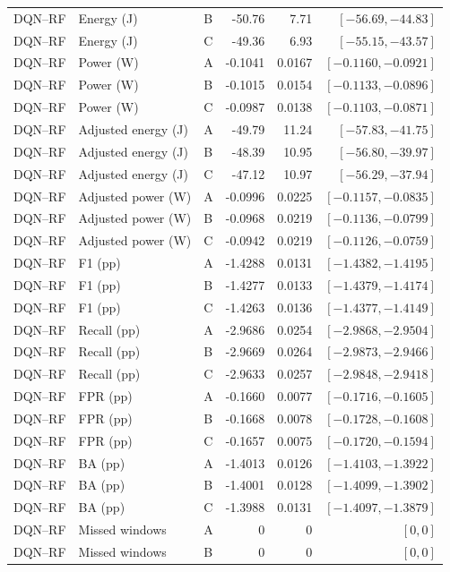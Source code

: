 \begin{longtable}{lllrrr}
DQN--RF & Energy (J) & B & -50.76 & 7.71 & $[-56.69,-44.83]$\\
DQN--RF & Energy (J) & C & -49.36 & 6.93 & $[-55.15,-43.57]$\\
DQN--RF & Power (W) & A & -0.1041 & 0.0167 & $[-0.1160,-0.0921]$\\
DQN--RF & Power (W) & B & -0.1015 & 0.0154 & $[-0.1133,-0.0896]$\\
DQN--RF & Power (W) & C & -0.0987 & 0.0138 & $[-0.1103,-0.0871]$\\
DQN--RF & Adjusted energy (J) & A & -49.79 & 11.24 & $[-57.83,-41.75]$\\
DQN--RF & Adjusted energy (J) & B & -48.39 & 10.95 & $[-56.80,-39.97]$\\
DQN--RF & Adjusted energy (J) & C & -47.12 & 10.97 & $[-56.29,-37.94]$\\
DQN--RF & Adjusted power (W) & A & -0.0996 & 0.0225 & $[-0.1157,-0.0835]$\\
DQN--RF & Adjusted power (W) & B & -0.0968 & 0.0219 & $[-0.1136,-0.0799]$\\
DQN--RF & Adjusted power (W) & C & -0.0942 & 0.0219 & $[-0.1126,-0.0759]$\\
DQN--RF & F1 (pp) & A & -1.4288 & 0.0131 & $[-1.4382,-1.4195]$\\
DQN--RF & F1 (pp) & B & -1.4277 & 0.0133 & $[-1.4379,-1.4174]$\\
DQN--RF & F1 (pp) & C & -1.4263 & 0.0136 & $[-1.4377,-1.4149]$\\
DQN--RF & Recall (pp) & A & -2.9686 & 0.0254 & $[-2.9868,-2.9504]$\\
DQN--RF & Recall (pp) & B & -2.9669 & 0.0264 & $[-2.9873,-2.9466]$\\
DQN--RF & Recall (pp) & C & -2.9633 & 0.0257 & $[-2.9848,-2.9418]$\\
DQN--RF & FPR (pp) & A & -0.1660 & 0.0077 & $[-0.1716,-0.1605]$\\
DQN--RF & FPR (pp) & B & -0.1668 & 0.0078 & $[-0.1728,-0.1608]$\\
DQN--RF & FPR (pp) & C & -0.1657 & 0.0075 & $[-0.1720,-0.1594]$\\
DQN--RF & BA (pp) & A & -1.4013 & 0.0126 & $[-1.4103,-1.3922]$\\
DQN--RF & BA (pp) & B & -1.4001 & 0.0128 & $[-1.4099,-1.3902]$\\
DQN--RF & BA (pp) & C & -1.3988 & 0.0131 & $[-1.4097,-1.3879]$\\
DQN--RF & Missed windows & A & 0 & 0 & $[0,0]$\\
DQN--RF & Missed windows & B & 0 & 0 & $[0,0]$\\

\end{longtable}
